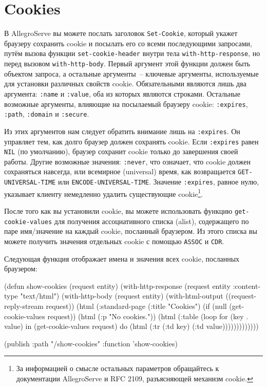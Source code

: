 \section{Cookies}

В AllegroServe вы можете послать заголовок \lstinline{Set-Cookie}, который укажет браузеру
сохранить cookie и посылать его со всеми последующими запросами, путём вызова функции
\lstinline{set-cookie-header} внутри тела \lstinline{with-http-response}, но перед вызовом
\lstinline{with-http-body}. Первый аргумент этой функции должен быть объектом запроса, а
остальные аргументы~-- ключевые аргументы, используемые для установки различных свойств
cookie. Обязательными являются лишь два аргумента: \lstinline{:name} и \lstinline{:value}, оба из
которых являются строками. Остальные возможные аргументы, влияющие на посылаемый браузеру
cookie: \lstinline{:expires}, \lstinline{:path}, \lstinline{:domain} и \lstinline{:secure}.

Из этих аргументов нам следует обратить внимание лишь на \lstinline{:expires}. Он управляет
тем, как долго браузер должен сохранять cookie. Если \lstinline{:expires} равен \lstinline{NIL}
(по умолчанию), браузер сохранит cookie только до завершения своей работы. Другие
возможные значения: \lstinline{:never}, что означает, что cookie должен сохраняться навсегда,
или всемирное (universal) время, как возвращается \lstinline{GET-UNIVERSAL-TIME} или
\lstinline{ENCODE-UNIVERSAL-TIME}. Значение \lstinline{:expires}, равное нулю, указывает клиенту
немедленно удалить существующие cookie\footnote{За информацией о смысле остальных
  параметров обращайтесь к документации AllegroServe и RFC 2109, разъясняющей механизм
  cookie.}.

После того как вы установили cookie, вы можете использовать функцию
\lstinline{get-cookie-values} для получения ассоциативного списка (alist), содержащего по паре
имя/значение на каждый cookie, посланный браузером. Из этого списка вы можете получить
значения отдельных cookie с помощью \lstinline{ASSOC} и \lstinline{CDR}.

Следующая функция отображает имена и значения всех cookie, посланных браузером:

\begin{myverb}
(defun show-cookies (request entity)
  (with-http-response (request entity :content-type "text/html")
    (with-http-body (request entity)
      (with-html-output ((request-reply-stream request))
        (html
          (:standard-page
           (:title "Cookies")
           (if (null (get-cookie-values request))
             (html (:p "No cookies."))
             (html 
               (:table
                 (loop for (key . value) in (get-cookie-values request)
                    do (html (:tr (:td key) (:td value)))))))))))))

(publish :path "/show-cookies" :function 'show-cookies)
\end{myverb}

